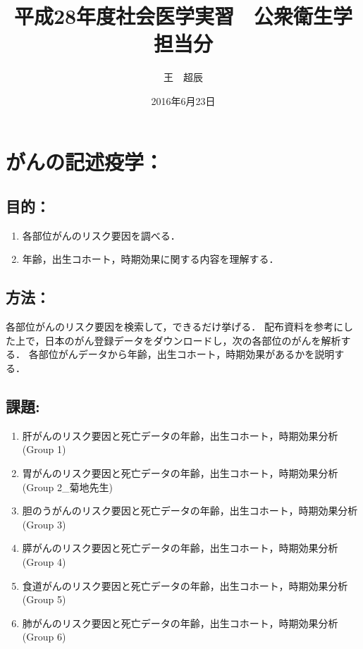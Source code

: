 \documentclass[11pt,]{article}
\title{平成28年度社会医学実習　公衆衛生学担当分}
\author{王　超辰}
\date{2016年6月23日}
\providecommand{\tightlist}{%
  \setlength{\itemsep}{0pt}\setlength{\parskip}{0pt}}
\begin{document}
\maketitle

\section{がんの記述疫学：}

\subsection{目的：}

\begin{enumerate}
\def\labelenumi{\arabic{enumi}.}
\tightlist
\item
  各部位がんのリスク要因を調べる．\\
\item
  年齢，出生コホート，時期効果に関する内容を理解する．
\end{enumerate}

\subsection{方法：}

各部位がんのリスク要因を検索して，できるだけ挙げる．
配布資料を参考にした上で，日本のがん登録データをダウンロードし，次の各部位のがんを解析する．
各部位がんデータから年齢，出生コホート，時期効果があるかを説明する．

\subsection{課題:}

\begin{enumerate}
\def\labelenumi{\arabic{enumi}.}
\item
  肝がんのリスク要因と死亡データの年齢，出生コホート，時期効果分析
  (Group 1)
\item
  胃がんのリスク要因と死亡データの年齢，出生コホート，時期効果分析
  (Group 2\_菊地先生)
\item
  胆のうがんのリスク要因と死亡データの年齢，出生コホート，時期効果分析
  (Group 3)
\item
  膵がんのリスク要因と死亡データの年齢，出生コホート，時期効果分析
  (Group 4)
\item
  食道がんのリスク要因と死亡データの年齢，出生コホート，時期効果分析
  (Group 5)
\item
  肺がんのリスク要因と死亡データの年齢，出生コホート，時期効果分析
  (Group 6)
\end{enumerate}
\end{document}

